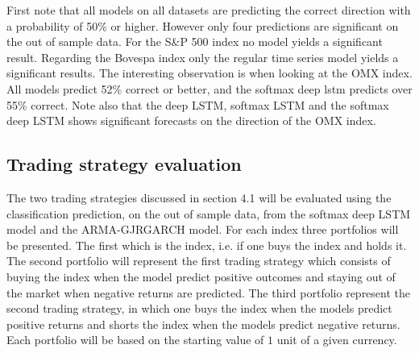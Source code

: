 \documentclass[12pt, letterpaper]{amsart}%
\begin{document}
First note that all models on all datasets are predicting the correct direction with a probability of 50\% or higher. However only four predictions are significant on the out of sample data. For the S\&P 500 index no model yields a significant result. Regarding the Bovespa index only the regular time series model yields a significant results. The interesting observation is when looking at the OMX index. All models predict 52\% correct or better, and the softmax deep lstm predicts over 55\% correct. Note also that the deep LSTM, softmax LSTM and the softmax deep LSTM shows significant forecasts on the direction of the OMX index.

\subsection{Trading strategy evaluation}
The two trading strategies discussed in section 4.1 will be evaluated using the classification prediction, on the out of sample data, from the softmax deep LSTM model and the ARMA-GJRGARCH model. For each index three portfolios will be presented. The first which is the index, i.e. if one buys the index and holds it. The second portfolio will represent the first trading strategy which consists of buying the index when the model predict positive outcomes and staying out of the market when negative returns are predicted. The third portfolio represent the second trading strategy, in which one buys the index when the models predict positive returns and shorts the index when the models predict negative returns. Each portfolio will be based on the starting value of $1$ unit of a given currency.
\end{document}
